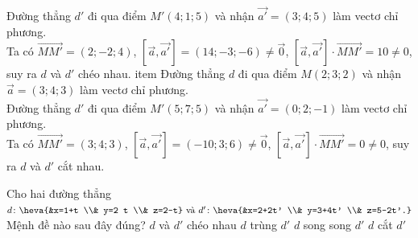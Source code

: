 \begin{vd}
{\begin{enumerate}
			Đường thẳng $d'$ đi qua điểm $M'(4;1;5)$ và nhận $\overrightarrow{a'}=(3;4;5)$ làm vectơ chỉ phương.\\
			Ta có $\overrightarrow{MM'}=(2;-2;4)$, $\left[ \overrightarrow{a}, \overrightarrow{a'} \right] = (14;-3;-6) \ne \overrightarrow{0}$, $\left[ \overrightarrow{a}, \overrightarrow{a'} \right] \cdot \overrightarrow{MM'} =10 \ne 0$, suy ra $d$ và $d'$ chéo nhau.
			item Đường thẳng $d$ đi qua điểm $M(2;3;2)$ và nhận $\overrightarrow{a}=(3;4;3)$ làm vectơ chỉ phương.\\
			Đường thẳng $d'$ đi qua điểm $M'(5;7;5)$ và nhận $\overrightarrow{a'}=(0;2;-1)$ làm vectơ chỉ phương.\\
			Ta có $\overrightarrow{MM'}=(3;4;3)$, $\left[ \overrightarrow{a}, \overrightarrow{a'} \right] = (-10;3;6) \ne \overrightarrow{0}$, $\left[ \overrightarrow{a}, \overrightarrow{a'} \right] \cdot \overrightarrow{MM'} =0 \ne 0$, suy ra $d$ và $d'$ cắt nhau.
		\end{enumerate}
	}
\end{vd}
\setcounter{ex}{0}

\begin{ex} %
	Cho hai đường thẳng $d\colon \heva{&x=1+t \\& y=2 t \\& z=2-t} \text{ và } d'\colon \heva{&x=2+2t' \\& y=3+4t' \\& z=5-2t'.}$ Mệnh đề nào sau đây đúng?
	\choice
	{$d$ và $d'$ chéo nhau}
	{$d$ trùng $d'$}
	{\True $d$ song song $d'$}
	{$d$ cắt $d'$}
\end{ex}

